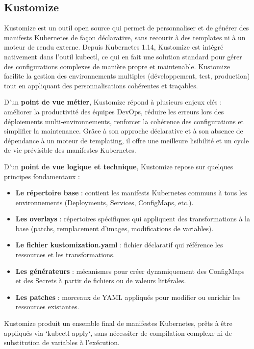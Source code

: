 \subsection{Kustomize}

Kustomize est un outil open source qui permet de personnaliser et de générer des manifests Kubernetes de façon déclarative, sans recourir à des templates ni à un moteur de rendu externe. Depuis Kubernetes 1.14, Kustomize est intégré nativement dans l’outil kubectl, ce qui en fait une solution standard pour gérer des configurations complexes de manière propre et maintenable. Kustomize facilite la gestion des environnements multiples (développement, test, production) tout en appliquant des personnalisations cohérentes et traçables.

D’un \textbf{point de vue métier}, Kustomize répond à plusieurs enjeux clés  : améliorer la productivité des équipes DevOps, réduire les erreurs lors des déploiements multi-environnements, renforcer la cohérence des configurations et simplifier la maintenance. Grâce à son approche déclarative et à son absence de dépendance à un moteur de templating, il offre une meilleure lisibilité et un cycle de vie prévisible des manifestes Kubernetes.

D’un \textbf{point de vue logique et technique}, Kustomize repose sur quelques principes fondamentaux  :
\begin{itemize}
	\item \textbf{Le répertoire base}  : contient les manifests Kubernetes communs à tous les environnements (Deployments, Services, ConfigMaps, etc.).
	\item \textbf{Les overlays}  : répertoires spécifiques qui appliquent des transformations à la base (patchs, remplacement d’images, modifications de variables).
	\item \textbf{Le fichier kustomization.yaml}  : fichier déclaratif qui référence les ressources et les transformations.
	\item \textbf{Les générateurs}  : mécanismes pour créer dynamiquement des ConfigMaps et des Secrets à partir de fichiers ou de valeurs littérales.
	\item \textbf{Les patches}  : morceaux de YAML appliqués pour modifier ou enrichir les ressources existantes.
\end{itemize}

Kustomize produit un ensemble final de manifestes Kubernetes, prêts à être appliqués via `kubectl apply`, sans nécessiter de compilation complexe ni de substitution de variables à l’exécution.

